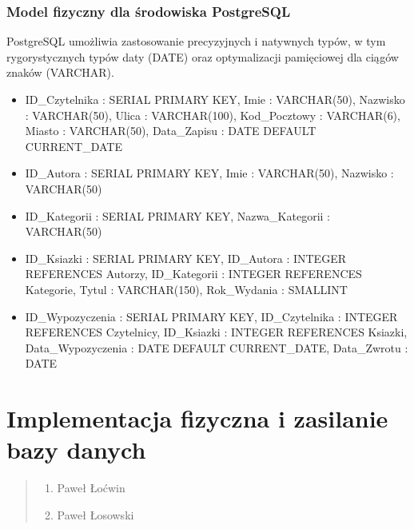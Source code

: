 \documentclass[a4paper,11pt,english,openany,oneside]{sphinxmanual}
\begin{document}
\subsection{Model fizyczny dla środowiska PostgreSQL}
\label{\detokenize{rozdzial_3/index:model-fizyczny-dla-srodowiska-postgresql}}
\sphinxAtStartPar
PostgreSQL umożliwia zastosowanie precyzyjnych i natywnych typów, w tym rygorystycznych typów daty (DATE) oraz optymalizacji pamięciowej dla ciągów znaków (VARCHAR).
\begin{itemize}
\item {} 
\sphinxAtStartPar
{} ID\_Czytelnika : SERIAL PRIMARY KEY, Imie : VARCHAR(50), Nazwisko : VARCHAR(50), Ulica : VARCHAR(100), Kod\_Pocztowy : VARCHAR(6), Miasto : VARCHAR(50), Data\_Zapisu : DATE DEFAULT CURRENT\_DATE

\item {} 
\sphinxAtStartPar
{} ID\_Autora : SERIAL PRIMARY KEY, Imie : VARCHAR(50), Nazwisko : VARCHAR(50)

\item {} 
\sphinxAtStartPar
{} ID\_Kategorii : SERIAL PRIMARY KEY, Nazwa\_Kategorii : VARCHAR(50)

\item {} 
\sphinxAtStartPar
{} ID\_Ksiazki : SERIAL PRIMARY KEY, ID\_Autora : INTEGER REFERENCES Autorzy, ID\_Kategorii : INTEGER REFERENCES Kategorie, Tytul : VARCHAR(150), Rok\_Wydania : SMALLINT

\item {} 
\sphinxAtStartPar
{} ID\_Wypozyczenia : SERIAL PRIMARY KEY, ID\_Czytelnika : INTEGER REFERENCES Czytelnicy, ID\_Ksiazki : INTEGER REFERENCES Ksiazki, Data\_Wypozyczenia : DATE DEFAULT CURRENT\_DATE, Data\_Zwrotu : DATE

\end{itemize}

\noindent{}

\sphinxstepscope


\chapter{Implementacja fizyczna i zasilanie bazy danych}
\label{\detokenize{rozdzial_4/index:implementacja-fizyczna-i-zasilanie-bazy-danych}}\label{\detokenize{rozdzial_4/index::doc}}\begin{quote}\begin{description}
\begin{enumerate}
%
\item {} 
\sphinxAtStartPar
Paweł Łoćwin

\item {} 
\sphinxAtStartPar
Paweł Łosowski

\end{enumerate}

\end{description}\end{quote}
\end{document}
